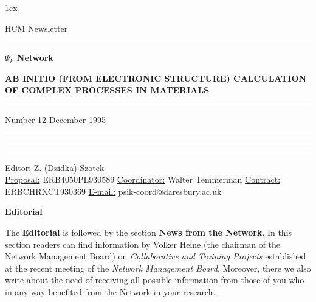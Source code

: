 \parskip 1ex
\vspace{2cm}
\begin{center}
{\Huge HCM Newsletter}
\end{center}
\vspace{3cm}
\rule{16.0cm}{1mm}
\vspace{1cm}
\begin{center}
{\huge \bf $\Psi_{k}$ Network}
\end{center}
\begin{center}
{\Large \bf AB INITIO (FROM ELECTRONIC STRUCTURE) 
CALCULATION OF COMPLEX PROCESSES IN MATERIALS}
\end{center}
\vspace{1cm}
\rule{16.0cm}{1mm}
{Number 12 \hspace{110mm} December 1995\\
\rule{16.0cm}{0.5mm}}
\vspace{8cm} 
\rule{16.0cm}{0.0mm}
\rule{16.0cm}{0.5mm}
\underline{Editor:} Z. (Dzidka) Szotek\\
{\underline{Proposal:} ERB4050PL930589 \hspace{45mm} \underline{Coordinator:} Walter Temmerman }
{\underline{Contract:} ERBCHRXCT930369 \hspace{41mm} \underline{E-mail:} psik-coord@daresbury.ac.uk }
\newpage
\null
\begin{center}
\Large {\bf Editorial \par}
\end{center}

\ni The {\bf Editorial} is followed by the section {\bf News from the Network}. In this section
readers can find information by Volker Heine (the chairman of the Network Management Board) on 
{\it Collaborative and 
Training Projects} established at the recent meeting of the {\it Network Management Board}. 
Moreover, there we also write about the need of receiving all possible information from those of 
you who in any way benefited from the Network in your research.\\

